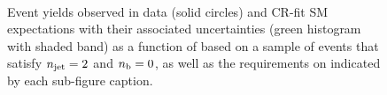 \begin{figure}[h!]
\begin{center}
    \\
    \caption{Event yields observed in data (solid circles) and CR-fit SM expectations with their associated uncertainties (green histogram with shaded band) as a function of \HTmiss based on a sample of events that satisfy $n_{\text{jet}} = 2$ and $n_{\text{b}} = 0$, as well as the requirements on \scalht indicated by each sub-figure caption. }
    \label{fig:mhtval_eq2j_eq0b}
  \end{center}
\end{figure}

